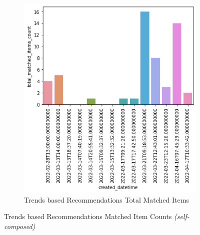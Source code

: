 \documentclass[manuscript,natbib=false, anonymous]{acmart}
\begin{document}
\begin{figure}[h]
\begin{subfigure}[b]{0.47\linewidth}
        \includegraphics[width=\linewidth]{images/total_matched_items_per_day.png}
        \caption{Trends based Recommendations Total Matched Items}
        \label{fig:trends-recsys-trends-total-matches}
     \end{subfigure}
     \hfill
        \caption{Trends based Recommendations Matched Item Counts \textit{(self-composed)}}
        \label{fig:matches-separated-graphs}
\end{figure}
\end{document}
